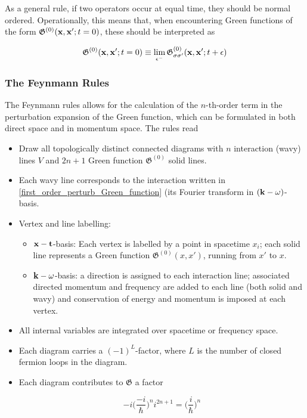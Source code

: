 As a general rule, if two operators occur at equal time, they should be normal ordered. Operationally, this means that, when encountering Green functions of the form $\mathfrak{G}^{(0)}({\bf x}, {\bf x}'; t = 0)$, these should be interpreted as 

\begin{equation}
    \mathfrak{G}^{(0)}({\bf x}, {\bf x}'; t = 0) \equiv \lim_{\epsilon^{-}} \mathfrak{G}_{\sigma \sigma'}^{(0)}({\bf x}, {\bf x}'; t + \epsilon)
\end{equation}

\subsubsection{The Feynmann Rules}

The Feynmann rules allows for the calculation of the $n$-th-order term in the perturbation expansion of the Green function, which can be formulated in both direct space and in momentum space. The rules read

\begin{itemize}
    \item Draw all topologically distinct connected diagrams with $n$ interaction (wavy) lines $V$ and $2n+1$ Green function $\mathfrak{G}^{(0)}$ solid lines. 
    \item Each wavy line corresponds to the interaction written in \cref{first_order_perturb_Green_function} (its Fourier transform in $({\bf k}-\omega)$-basis.
    \item Vertex and line labelling: 
    \begin{itemize}
        \item ${\bf x -t}$-basis: Each vertex is labelled by a point in spacetime $x_i$; each solid line represents a Green function $\mathfrak{G}^{(0)}(x,x')$, running from $x'$ to $x$.
        \item ${\bf k}-\omega$-basis: a direction is assigned to each interaction line; associated directed momentum and frequency are added to each line (both solid and wavy) and conservation of energy and momentum is imposed at each vertex. 
    \end{itemize}
    \item All internal variables are integrated over spacetime or frequency space. 
    \item Each diagram carries a $(-1)^L$-factor, where $L$ is the number of closed fermion loops in the diagram.
    \item Each diagram contributes to $\mathfrak{G}$ a factor 

    $$
        -i \bigg(\frac{-i}{\hbar}\bigg)^n i^{2n+1} = \bigg(\frac{i}{\hbar}\bigg)^n 
    $$
\end{itemize}


